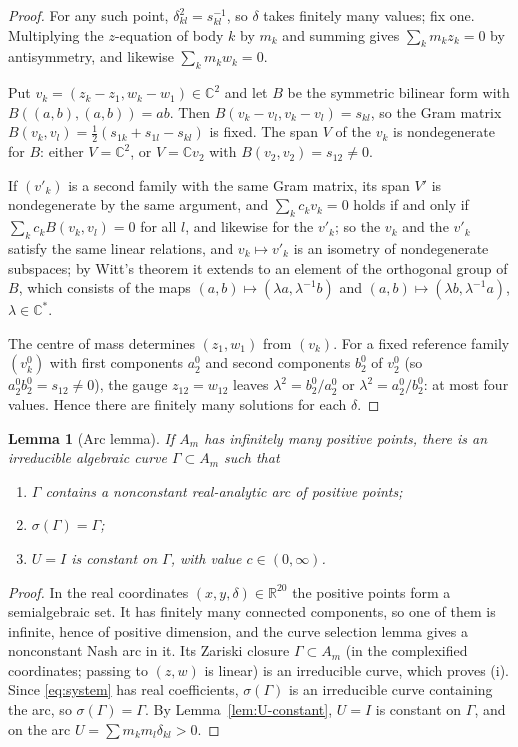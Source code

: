 \documentclass[11pt]{amsart}
\newenvironment{romanlist}{\begin{enumerate}\renewcommand{\labelenumi}{(\roman{enumi})}%
  \renewcommand{\theenumi}{\roman{enumi}}}{\end{enumerate}}
\newtheorem{lemma}[theorem]{Lemma}
\theoremstyle{definition}
\theoremstyle{remark}
\newcommand{\C}{\mathbb{C}}
\newcommand{\R}{\mathbb{R}}
\begin{document}
\begin{proof}
For any such point, $\delta_{kl}^2=s_{kl}^{-1}$, so $\delta$ takes finitely many values; fix one.
Multiplying the $z$-equation of body $k$ by $m_k$ and summing gives $\sum_km_kz_k=0$ by
antisymmetry, and likewise $\sum_km_kw_k=0$.

Put $v_k=(z_k-z_1,w_k-w_1)\in\C^2$ and let $B$ be
the symmetric bilinear form with $B((a,b),(a,b))=ab$.  Then $B(v_k-v_l,v_k-v_l)=s_{kl}$, so the
Gram matrix $B(v_k,v_l)=\frac12(s_{1k}+s_{1l}-s_{kl})$ is fixed.  The span $V$ of the $v_k$ is
nondegenerate for $B$: either $V=\C^2$, or $V=\C v_2$ with $B(v_2,v_2)=s_{12}\ne0$.

If
$(v'_k)$ is a second family with the same Gram matrix, its span $V'$ is nondegenerate by the
same argument, and $\sum_kc_kv_k=0$ holds if and only if $\sum_kc_kB(v_k,v_l)=0$ for all $l$,
and likewise for the $v'_k$; so the $v_k$ and the $v'_k$ satisfy the same linear relations, and
$v_k\mapsto v'_k$ is an isometry of nondegenerate subspaces; by Witt's theorem it extends to an
element of the orthogonal group of $B$, which consists of the maps $(a,b)\mapsto(\lambda a,
\lambda^{-1}b)$ and $(a,b)\mapsto(\lambda b,\lambda^{-1}a)$, $\lambda\in\C^*$.

The centre of
mass determines $(z_1,w_1)$ from $(v_k)$.  For a fixed reference family $(v^0_k)$ with first
components $a^0_2$ and second components $b^0_2$ of $v^0_2$ (so $a^0_2b^0_2=s_{12}\ne0$), the gauge
$z_{12}=w_{12}$ leaves $\lambda^2=b^0_2/a^0_2$ or $\lambda^2=a^0_2/b^0_2$: at most four values.
Hence there are finitely many solutions for each $\delta$.
\end{proof}

\begin{lemma}[Arc lemma]\label{lem:arc}
If $A_m$ has infinitely many positive points, there is an irreducible algebraic curve
$\Gamma\subset A_m$ such that
\begin{romanlist}
  \item $\Gamma$ contains a nonconstant real-analytic arc of positive points;
  \item $\sigma(\Gamma)=\Gamma$;
  \item $U=I$ is constant on $\Gamma$, with value $c\in(0,\infty)$.
\end{romanlist}
\end{lemma}

\begin{proof}
In the real coordinates $(x,y,\delta)\in\R^{20}$ the positive points form a semialgebraic set.
It has finitely many connected components, so one of them is infinite, hence of positive
dimension, and the curve selection lemma \cite[Thm.~2.5.5]{BCR} gives a nonconstant Nash arc in
it.  Its Zariski closure $\Gamma\subset A_m$ (in the complexified coordinates; passing to $(z,w)$ is linear) is an
irreducible curve, which proves (i).  Since \eqref{eq:system} has real coefficients, $\sigma(
\Gamma)$ is an irreducible curve containing the arc, so $\sigma(\Gamma)=\Gamma$.  By
Lemma~\ref{lem:U-constant}, $U=I$ is constant on $\Gamma$, and on the arc
$U=\sum m_km_l\delta_{kl}>0$.
\end{proof}
\end{document}
